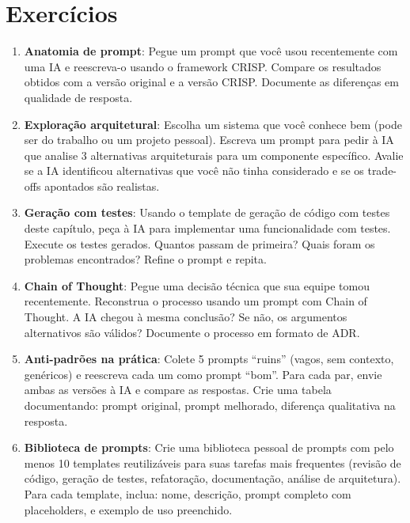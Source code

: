\section*{Exercícios}

\begin{enumerate}
    \item \textbf{Anatomia de prompt}: Pegue um prompt que você usou
    recentemente com uma IA e reescreva-o usando o framework CRISP. Compare os
    resultados obtidos com a versão original e a versão CRISP. Documente as
    diferenças em qualidade de resposta.

    \item \textbf{Exploração arquitetural}: Escolha um sistema que você conhece
    bem (pode ser do trabalho ou um projeto pessoal). Escreva um prompt para
    pedir à IA que analise 3 alternativas arquiteturais para um componente
    específico. Avalie se a IA identificou alternativas que você não tinha
    considerado e se os trade-offs apontados são realistas.

    \item \textbf{Geração com testes}: Usando o template de geração de código
    com testes deste capítulo, peça à IA para implementar uma funcionalidade
    com testes. Execute os testes gerados. Quantos passam de primeira? Quais
    foram os problemas encontrados? Refine o prompt e repita.

    \item \textbf{Chain of Thought}: Pegue uma decisão técnica que sua equipe
    tomou recentemente. Reconstrua o processo usando um prompt com Chain of
    Thought. A IA chegou à mesma conclusão? Se não, os argumentos alternativos
    são válidos? Documente o processo em formato de ADR.

    \item \textbf{Anti-padrões na prática}: Colete 5 prompts ``ruins'' (vagos,
    sem contexto, genéricos) e reescreva cada um como prompt ``bom''. Para cada
    par, envie ambas as versões à IA e compare as respostas. Crie uma tabela
    documentando: prompt original, prompt melhorado, diferença qualitativa na
    resposta.

    \item \textbf{Biblioteca de prompts}: Crie uma biblioteca pessoal de
    prompts com pelo menos 10 templates reutilizáveis para suas tarefas mais
    frequentes (revisão de código, geração de testes, refatoração, documentação,
    análise de arquitetura). Para cada template, inclua: nome, descrição, prompt
    completo com placeholders, e exemplo de uso preenchido.
\end{enumerate}

